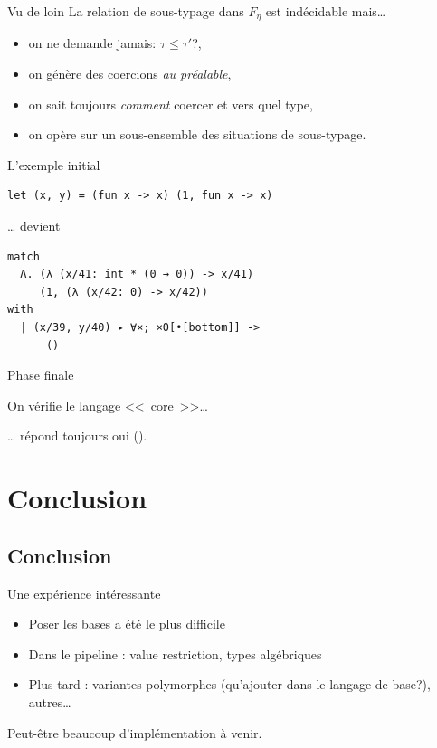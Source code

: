 \documentclass[final]{beamer}
\begin{document}
\begin{frame}{Vu de loin}
  La relation de sous-typage dans $F_\eta$ est indécidable mais…
  \begin{itemize}
    \item on ne demande jamais: $\tau \leq \tau'$?,
    \item on génère des coercions \emph{au préalable},
    \item on sait toujours \emph{comment} coercer et vers quel type,
    \item on opère sur un sous-ensemble des situations de sous-typage.
  \end{itemize}
\end{frame}

\begin{frame}[fragile]{L'exemple initial}

  \begin{verbatim}
let (x, y) = (fun x -> x) (1, fun x -> x)
  \end{verbatim}

  … devient

  \begin{verbatim}
match
  Λ. (λ (x/41: int * (0 → 0)) -> x/41)
     (1, (λ (x/42: 0) -> x/42))
with
  | (x/39, y/40) ▸ ∀×; ×0[•[bottom]] ->
      ()
  \end{verbatim}

\end{frame}

\begin{frame}{Phase finale}
  \begin{center}
On vérifie le langage <<~core~>>…

\vspace{5ex}

… répond toujours oui ().
  \end{center}
\end{frame}

\section{Conclusion}

\subsection{Conclusion}

\begin{frame}{Une expérience intéressante}
  \begin{itemize}
    \item Poser les bases a été le plus difficile
    \item Dans le pipeline : value restriction, types algébriques
    \item Plus tard : variantes polymorphes (qu'ajouter dans le langage de
      base?), autres…
  \end{itemize}

  Peut-être beaucoup d'implémentation à venir.
\end{frame}
\end{document}
